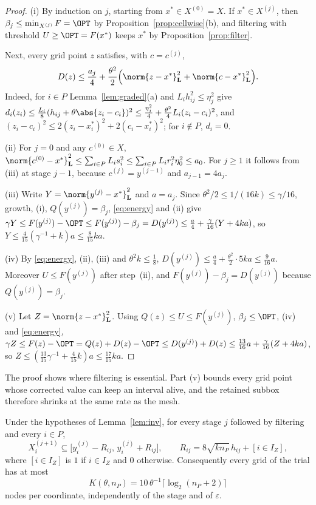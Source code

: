 \begin{proof}
(i) By induction on $j$, starting from $x^*\in X^{(0)}=X$. If
$x^*\in X^{(j)}$, then $\beta_j\le\min_{X^{(j)}}F=\OPT$ by
Proposition~\ref{prop:cellwise}(b), and filtering with threshold
$U\ge\OPT=F(x^*)$ keeps $x^*$ by Proposition~\ref{prop:filter}.

Next, every grid point $z$ satisfies, with $c=c^{(j)}$,
\begin{equation}\label{eq:energy}
D(z)\le\frac{a_j}4+\frac{\theta^2}2\Bigl(\norm{z-x^*}_{\mathbf L}^2
+\norm{c-x^*}_{\mathbf L}^2\Bigr).
\end{equation}
Indeed, for $i\in P$ Lemma~\ref{lem:graded}(a) and $L_ih_{ij}^2\le\eta_j^2$
give $d_i(z_i)\le\frac{L_i}8(h_{ij}+\theta\abs{z_i-c_i})^2\le\frac{\eta_j^2}4
+\frac{\theta^2}4L_i(z_i-c_i)^2$, and
$(z_i-c_i)^2\le2(z_i-x_i^*)^2+2(c_i-x_i^*)^2$; for $i\notin P$, $d_i=0$.

(ii) For $j=0$ and any $c^{(0)}\in X$,
$\norm{c^{(0)}-x^*}_{\mathbf L}^2\le\sum_{i\in P}L_is_i^2\le
\sum_{i\in P}L_ir_i^2\eta_0^2\le a_0$. For $j\ge1$ it follows from (iii) at
stage $j-1$, because $c^{(j)}=y^{(j-1)}$ and $a_{j-1}=4a_j$.

(iii) Write $Y=\norm{y^{(j)}-x^*}_{\mathbf L}^2$ and $a=a_j$. Since
$\theta^2/2\le1/(16k)\le\gamma/16$, growth, (i), $Q(y^{(j)})=\beta_j$,
\eqref{eq:energy} and (ii) give
$\gamma Y\le F(y^{(j)})-\OPT\le F(y^{(j)})-\beta_j=D(y^{(j)})
\le\frac a4+\frac\gamma{16}(Y+4ka)$, so
$Y\le\frac4{15}(\gamma^{-1}+k)a\le\frac8{15}ka$.

(iv) By \eqref{eq:energy}, (ii), (iii) and $\theta^2k\le\frac18$,
$D(y^{(j)})\le\frac a4+\frac{\theta^2}2\cdot5ka\le\frac9{16}a$. Moreover
$U\le F(y^{(j)})$ after step~(ii), and $F(y^{(j)})-\beta_j=D(y^{(j)})$
because $Q(y^{(j)})=\beta_j$.

(v) Let $Z=\norm{z-x^*}_{\mathbf L}^2$. Using $Q(z)\le U\le F(y^{(j)})$,
$\beta_j\le\OPT$, (iv) and \eqref{eq:energy},
$\gamma Z\le F(z)-\OPT=Q(z)+D(z)-\OPT\le D(y^{(j)})+D(z)\le\frac{13}{16}a
+\frac\gamma{16}(Z+4ka)$, so
$Z\le(\frac{13}{15}\gamma^{-1}+\frac4{15}k)a\le\frac{17}{15}ka$.
\end{proof}

The proof shows where filtering is essential. Part (v) bounds every grid point
whose corrected value can keep an interval alive, and the retained subbox
therefore shrinks at the same rate as the mesh.

\begin{lemma}\label{lem:states}
Under the hypotheses of Lemma~\ref{lem:inv}, for every stage $j$ followed by
filtering and every $i\in P$,
\[
X_i^{(j+1)}\subseteq\bigl[y_i^{(j)}-R_{ij},\,y_i^{(j)}+R_{ij}\bigr],\qquad
R_{ij}=8\sqrt{kn_P}\,h_{ij}+[i\in I_Z],
\]
where $[i\in I_Z]$ is $1$ if $i\in I_Z$ and $0$ otherwise. Consequently
every grid of the trial has at most
\begin{equation}\label{eq:statecap}
K(\theta,n_P)=10\,\theta^{-1}\lceil\log_2(n_P+2)\rceil
\end{equation}
nodes per coordinate, independently of the stage and of $\varepsilon$.
\end{lemma}

